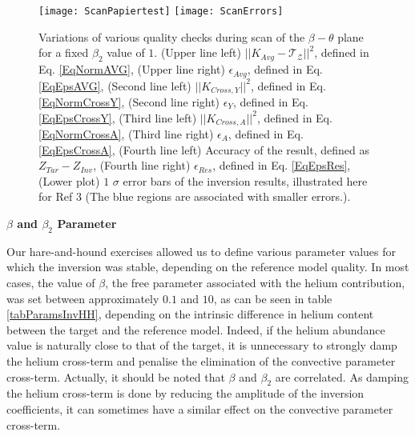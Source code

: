 \documentclass[a4paper,fleqn,usenatbib]{mnras}
\begin{document}
\begin{figure*}
	\flushleft
		\texttt{[image: ScanPapiertest]}
		\centering
		\texttt{[image: ScanErrors]}
	\caption{Variations of various quality checks during scan of the $\beta-\theta$ plane for a fixed $\beta_{2}$ value of $1$. (Upper line left) $\vert \vert K_{Avg}-\mathcal{T}_{\mathcal{Z}} \vert \vert^{2}$, defined in Eq. \ref{EqNormAVG},  (Upper line right) $\epsilon_{Avg}$, defined in Eq. \ref{EqEpsAVG}, (Second line left) $\vert \vert K_{Cross,Y} \vert \vert^{2}$, defined in Eq. \ref{EqNormCrossY}, (Second line right) $\epsilon_{Y}$, defined in Eq. \ref{EqEpsCrossY}, (Third line left) $\vert \vert K_{Cross,A} \vert \vert^{2}$, defined in Eq. \ref{EqNormCrossA}, (Third line right) $\epsilon_{A}$, defined in Eq. \ref{EqEpsCrossA}, (Fourth line left)  Accuracy of the result, defined as $Z_{Tar}-Z_{Inv}$, (Fourth line right) $\epsilon_{Res}$, defined in Eq. \ref{EqEpsRes}, (Lower plot) $1$ $\sigma$ error bars of the inversion results, illustrated here for Ref $3$ (The blue regions are associated with smaller errors.).}
		\label{figScan}
\end{figure*}
\begin{flushleft}
\textbf{$\beta$ and $\beta_{2}$ Parameter}
\end{flushleft}
Our hare-and-hound exercises allowed us to define various parameter values for which the inversion was stable, depending on the reference model quality. In most cases, the value of $\beta$, the free parameter associated with the helium contribution, was set between approximately $0.1$ and $10$, as can be seen in table \ref{tabParamsInvHH}, depending on the intrinsic difference in helium content between the target and the reference model. Indeed, if the helium abundance value is naturally close to that of the target, it is unnecessary to strongly damp the helium cross-term and penalise the elimination of the convective parameter cross-term. Actually, it should be noted that $\beta$ and $\beta_{2}$ are correlated. As damping the helium cross-term is done by reducing the amplitude of the inversion coefficients, it can sometimes have a similar effect on the convective parameter cross-term.
\end{document}
